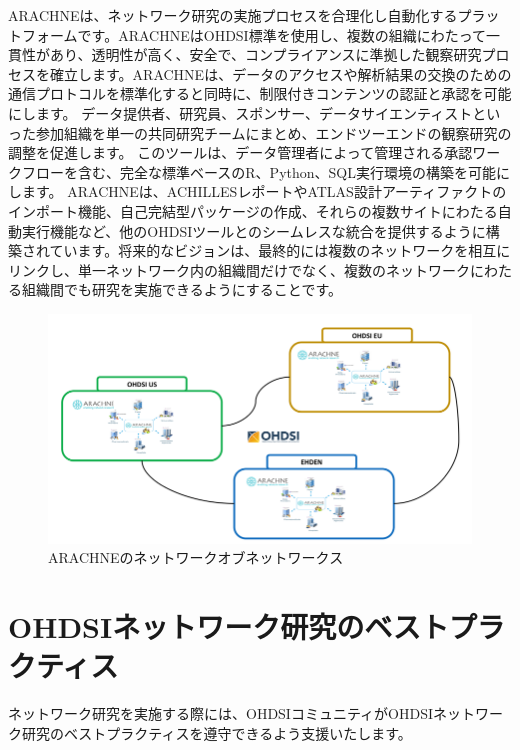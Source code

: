 \documentclass[
  11pt]{book}
\theoremstyle{definition}
\theoremstyle{definition}
\theoremstyle{definition}
\theoremstyle{definition}
\theoremstyle{remark}
\begin{document}
ARACHNEは、ネットワーク研究の実施プロセスを合理化し自動化するプラットフォームです。ARACHNEはOHDSI標準を使用し、複数の組織にわたって一貫性があり、透明性が高く、安全で、コンプライアンスに準拠した観察研究プロセスを確立します。ARACHNEは、データのアクセスや解析結果の交換のための通信プロトコルを標準化すると同時に、制限付きコンテンツの認証と承認を可能にします。 データ提供者、研究員、スポンサー、データサイエンティストといった参加組織を単一の共同研究チームにまとめ、エンドツーエンドの観察研究の調整を促進します。 このツールは、データ管理者によって管理される承認ワークフローを含む、完全な標準ベースのR、Python、SQL実行環境の構築を可能にします。 ARACHNEは、ACHILLESレポートやATLAS設計アーティファクトのインポート機能、自己完結型パッケージの作成、それらの複数サイトにわたる自動実行機能など、他のOHDSIツールとのシームレスな統合を提供するように構築されています。将来的なビジョンは、最終的には複数のネットワークを相互にリンクし、単一ネットワーク内の組織間だけでなく、複数のネットワークにわたる組織間でも研究を実施できるようにすることです。

\begin{figure}[h]

{\centering \includegraphics[width=0.9\linewidth]{images/NetworkStudies/ARACHNENON} 

}

\caption{ARACHNEのネットワークオブネットワークス}\label{fig:arachneNon}
\end{figure}

\section{OHDSIネットワーク研究のベストプラクティス}\label{ohdsiux30cdux30c3ux30c8ux30efux30fcux30afux7814ux7a76ux306eux30d9ux30b9ux30c8ux30d7ux30e9ux30afux30c6ux30a3ux30b9}


ネットワーク研究を実施する際には、OHDSIコミュニティがOHDSIネットワーク研究のベストプラクティスを遵守できるよう支援いたします。
\end{document}
